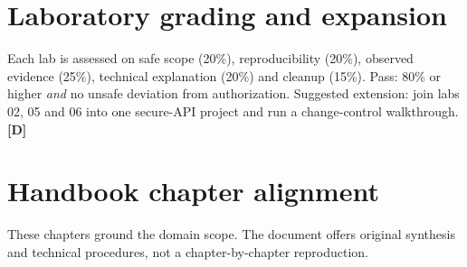 \documentclass[10pt,letterpaper,oneside]{article}
\newcommand{\designed}{\textsf{\color{accent}\textbf{[D]}}}
\begin{document}
\section{Laboratory grading and expansion}
Each lab is assessed on safe scope (20\%), reproducibility (20\%), observed evidence (25\%), technical explanation (20\%) and cleanup (15\%). Pass: 80\% or higher \emph{and} no unsafe deviation from authorization. Suggested extension: join labs 02, 05 and 06 into one secure-API project and run a change-control walkthrough. \designed{}

\section*{Handbook chapter alignment}
These chapters ground the domain scope. The document offers original synthesis and technical procedures, not a chapter-by-chapter reproduction.
\end{document}
